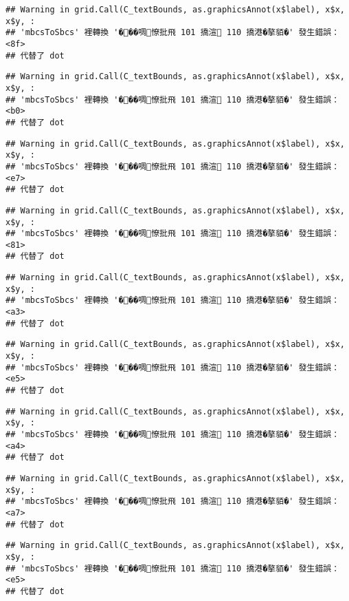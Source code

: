 \documentclass[
]{article}
\begin{document}
\begin{verbatim}
## Warning in grid.Call(C_textBounds, as.graphicsAnnot(x$label), x$x, x$y, :
## 'mbcsToSbcs' 裡轉換 '���啁憭批飛 101 撟渲 110 撟港�摮貊�' 發生錯誤：<8f>
## 代替了 dot
\end{verbatim}

\begin{verbatim}
## Warning in grid.Call(C_textBounds, as.graphicsAnnot(x$label), x$x, x$y, :
## 'mbcsToSbcs' 裡轉換 '���啁憭批飛 101 撟渲 110 撟港�摮貊�' 發生錯誤：<b0>
## 代替了 dot
\end{verbatim}

\begin{verbatim}
## Warning in grid.Call(C_textBounds, as.graphicsAnnot(x$label), x$x, x$y, :
## 'mbcsToSbcs' 裡轉換 '���啁憭批飛 101 撟渲 110 撟港�摮貊�' 發生錯誤：<e7>
## 代替了 dot
\end{verbatim}

\begin{verbatim}
## Warning in grid.Call(C_textBounds, as.graphicsAnnot(x$label), x$x, x$y, :
## 'mbcsToSbcs' 裡轉換 '���啁憭批飛 101 撟渲 110 撟港�摮貊�' 發生錯誤：<81>
## 代替了 dot
\end{verbatim}

\begin{verbatim}
## Warning in grid.Call(C_textBounds, as.graphicsAnnot(x$label), x$x, x$y, :
## 'mbcsToSbcs' 裡轉換 '���啁憭批飛 101 撟渲 110 撟港�摮貊�' 發生錯誤：<a3>
## 代替了 dot
\end{verbatim}

\begin{verbatim}
## Warning in grid.Call(C_textBounds, as.graphicsAnnot(x$label), x$x, x$y, :
## 'mbcsToSbcs' 裡轉換 '���啁憭批飛 101 撟渲 110 撟港�摮貊�' 發生錯誤：<e5>
## 代替了 dot
\end{verbatim}

\begin{verbatim}
## Warning in grid.Call(C_textBounds, as.graphicsAnnot(x$label), x$x, x$y, :
## 'mbcsToSbcs' 裡轉換 '���啁憭批飛 101 撟渲 110 撟港�摮貊�' 發生錯誤：<a4>
## 代替了 dot
\end{verbatim}

\begin{verbatim}
## Warning in grid.Call(C_textBounds, as.graphicsAnnot(x$label), x$x, x$y, :
## 'mbcsToSbcs' 裡轉換 '���啁憭批飛 101 撟渲 110 撟港�摮貊�' 發生錯誤：<a7>
## 代替了 dot
\end{verbatim}

\begin{verbatim}
## Warning in grid.Call(C_textBounds, as.graphicsAnnot(x$label), x$x, x$y, :
## 'mbcsToSbcs' 裡轉換 '���啁憭批飛 101 撟渲 110 撟港�摮貊�' 發生錯誤：<e5>
## 代替了 dot
\end{verbatim}
\end{document}
